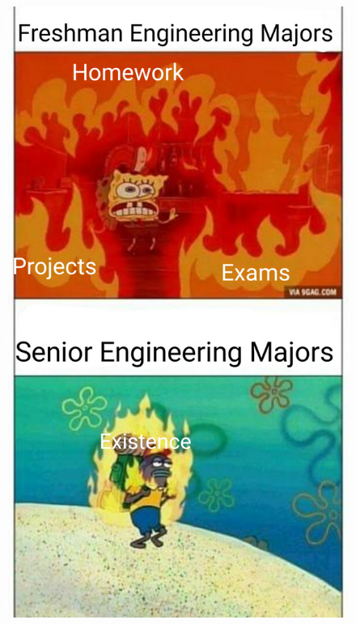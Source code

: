 \documentclass[xcolor=dvipsnames,aspectratio=169]{beamer}
\begin{document}
\begin{frame}\frametitle{}
\begin{figure}[]
\centering
\includegraphics[scale=0.18]{sponge2}
\end{figure}
\end{frame}
\end{document}
